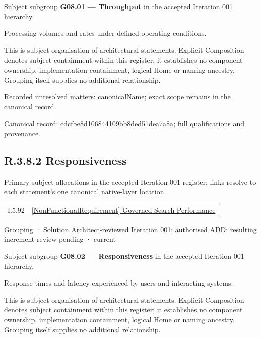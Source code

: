 Subject subgroup \textbf{G08.01 — Throughput} in the accepted Iteration 001 hierarchy.



Processing volumes and rates under defined operating conditions.



This is subject organisation of architectural statements. Explicit Composition denotes subject containment within this register; it establishes no component ownership, implementation containment, logical Home or naming ancestry. Grouping itself supplies no additional relationship.


{\small Recorded unresolved matters: canonicalName; exact scope remains in the canonical record.}\par
{\footnotesize \href{../../../../continuum/grouping/cdcfbe8d106844109bb8ded51dea7a8a.md}{Canonical record: cdcfbe8d106844109bb8ded51dea7a8a}; full qualifications and provenance.}\par
\subsection*{R.3.8.2 Responsiveness}
\label{navigation:R.3.8.2}

Primary subject allocations in the accepted Iteration 001 register; links resolve to each statement’s one canonical native-layer location.\par
\begin{longtable}{p{.22\linewidth}p{.73\linewidth}}
I.5.92 & \hyperref[element:b29075c844cf403fb1322b4d1aba8803]{[NonFunctionalRequirement] Governed Search Performance} \\
\end{longtable}
\label{element:47d8e097526248349dd6dbbd318b1ef4}
{\small Grouping · Solution Architect-reviewed Iteration 001; authorised ADD; resulting increment review pending · current}\par

Subject subgroup \textbf{G08.02 — Responsiveness} in the accepted Iteration 001 hierarchy.



Response times and latency experienced by users and interacting systems.



This is subject organisation of architectural statements. Explicit Composition denotes subject containment within this register; it establishes no component ownership, implementation containment, logical Home or naming ancestry. Grouping itself supplies no additional relationship.


